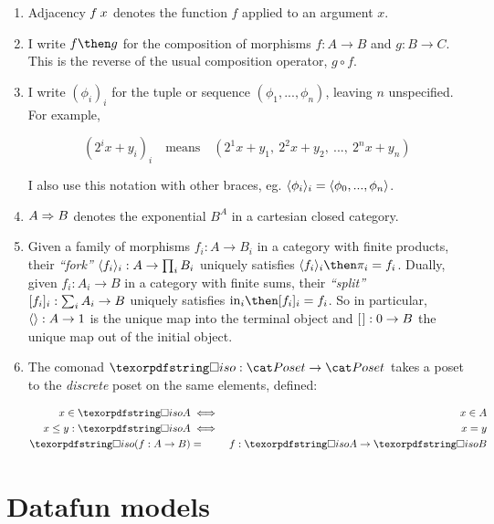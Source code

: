 \documentclass{rntz}\usepackage{fantasy}%
\begin{document}
\begin{enumerate}
\item Adjacency $f\<x$ denotes the function $f$ applied to an argument $x$.

\item I write $f \then g$ for the composition of morphisms $f : A \to B$ and $g
  : B \to C$. This is the reverse of the usual composition operator, $g \circ
  f$.

  \newcommand\iexpr{\phi}
\item I write $(\iexpr_i)_i$ for the tuple or sequence $(\iexpr_1,
  ..., \iexpr_n)$, leaving $n$ unspecified. For example,

  \nopagebreak[2]
  \[ (2^ix + y_i)_i \quad\text{means}\quad
  (2^1x + y_1,~ 2^2x + y_2,~ ...,~ 2^nx + y_n) \]

  \noindent
  I also use this notation with other braces, eg. $\fork{\iexpr_i}_i =
  \fork{\iexpr_0, ..., \iexpr_n}$.

\item $A \Rightarrow B$ denotes the exponential $B^A$ in a cartesian closed category.

\item Given a family of morphisms $f_i : A \to B_i$ in a category with finite
  products, their \emph{``fork''} $\langle{f_i}\rangle_i : A \to \textstyle\prod_{i} B_i$
  uniquely satisfies $\fork{f_i}_i \then \pi_i = f_i$. Dually, given $f_i : A_i
  \to B$ in a category with finite sums, their \emph{``split''} $[{f_i}]_i :
  \sum_i A_i \to B$ uniquely satisfies $\injc_i \then \krof{f_i}_i = f_i$.
  So in particular, $\langle{}\rangle : A \to 1$ is the unique map into the terminal
  object and $[{\kern .08em}] : 0 \to B$ the unique map out of the initial object.

\item The comonad $\iso : \Poset \to \Poset$ takes a poset to the
  \emph{discrete} poset on the same elements, defined:

  \begin{eqnarray*}
    x \in \isof A &\iff& x \in A\\
    x \le y : \isof A &\iff& x = y\\
    \isof(f : A \to B) &=& f : \isof A \to \isof B
  \end{eqnarray*}
\end{enumerate}


\section{Datafun models}
\label{sec:datafun-models}
\end{document}
